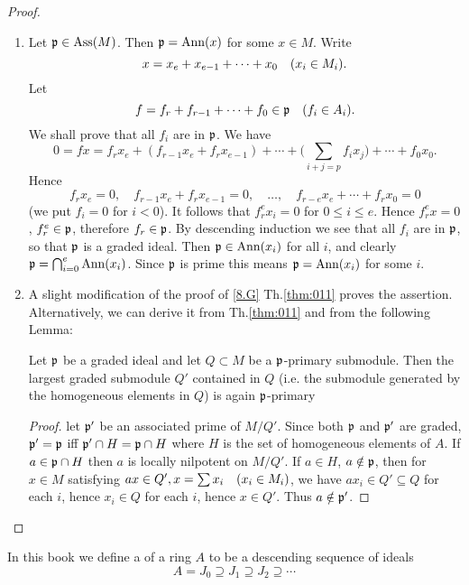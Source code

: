 \documentclass[../main]{subfiles}
\begin{document}
\begin{proof}
\begin{enumerate}[label = \roman*)]
    \item Let $\mathfrak{p} \in \operatorname{Ass}(M)$. Then $\mathfrak{p}=\operatorname{Ann}(x)$ for some $x \in M$. Write \[x=x_e+x_{e-1}+\cdots+x_0\for{x_i \in M_i}.\] Let \[f=f_r+f_{r-1}+\cdots+f_0\in \ideal{p}\for{f_i \in A_i}.\] We shall prove that all $f_i$ are in $\mathfrak{p}$. We have
    \[0=fx=f_rx_e+(f_{r-1}x_e+f_rx_{e-1})+\cdots+\Big(\sum_{i+j=p} f_i x_j\Big)+\cdots+f_0 x_0.\] 
    Hence 
    \[f_r x_e=0, \quad f_{r-1}x_e+f_rx_{e-1}=0,\quad \dots, \quad f_{r-e}x_e+\cdots+f_r x_0=0\] (we put $f_i=0$ for $i<0$). It follows that $f_r^ex_i=0$ for $0\leqslant i\leqslant e$. Hence $f_r^ex=0$, $f_r^e \in \mathfrak{p}$, therefore $f_r\in\mathfrak{p}$. By descending induction we see that all $f_i$ are in $\mathfrak{p}$, so that $\mathfrak{p}$ is a graded ideal. Then $\mathfrak{p} \in \operatorname{Ann}(x_i)$ for all $i$, and clearly $\mathfrak{p}=\bigcap_{i=0}^e \operatorname{Ann}(x_i)$. Since $\mathfrak{p}$ is prime this means $\mathfrak{p}=\operatorname{Ann}(x_i)$ for some $i$.

    \item A slight modification of the proof of \ref{8.G} Th.\ref{thm:011} proves the assertion. Alternatively, we can derive it from Th.\ref{thm:011} and from the following Lemma:
    \begin{lemma}
    Let $\mathfrak{p}$ be a graded ideal and let $Q \subset M$ be a $\mathfrak{p}$-primary submodule. Then the largest graded submodule $Q'$ contained in $Q$ (i.e. the submodule generated by the homogeneous elements in $Q$) is again $\mathfrak{p}$-primary 
    \end{lemma}
    \begin{proof} let $\mathfrak{p}'$ be an associated prime of $M / Q'$. Since both $\mathfrak{p}$ and $\mathfrak{p}'$ are graded, $\mathfrak{p}'=\mathfrak{p}$ iff $\mathfrak{p}'\cap H=\mathfrak{p} \cap H$ where $H$ is the set of homogeneous elements of $A$. If $a \in \mathfrak{p} \cap H$ then $a$ is locally nilpotent on $M / Q'$. If $a \in H$, $a \notin \mathfrak{p}$, then for $x \in M$ satisfying $ax \in Q', x=\sum x_i\for{x_i \in M_i}$, we have $ax_i \in Q' \subseteq Q$ for each $i$, hence $x_i \in Q$ for each $i$, hence $x \in Q'$. Thus $a \notin \mathfrak{p}'$.
    \end{proof}
\end{enumerate}

\end{proof}

\newparagraph In this book we define a  of a ring $A$ to be a descending sequence of ideals
\[\tag{10.$\dagger$}\label{cond:10.dag}A=J_0 \supseteq J_1 \supseteq J_2 \supseteq \cdots \]
\end{document}
